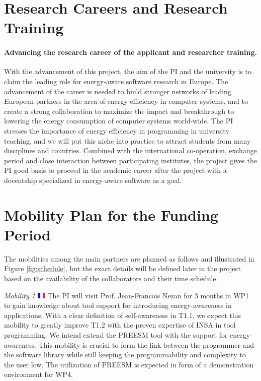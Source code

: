 \documentclass{article}
\begin{document}
\section{Research Careers and Research Training}
\label{sec:cooperation}
\paragraph{Advancing the research career of the applicant and researcher training.}
With the advancement of this project, the aim of the PI and the university is to claim the leading role for energy-aware software research in Europe.
The advancement of the career is needed to build stronger networks of leading European partners in the area of energy efficiency in computer systems,
and to create a strong collaboration to maximize the impact and breakthrough to lowering the energy consumption of computer systems world-wide.
The PI stresses the importance of energy efficiency in programming in university teaching, and we will put this niche into practice to attract students from many disciplines and countries.
Combined with the international co-operation, exchange period and close interaction between participating institutes, the project gives the PI good basis to proceed in the academic career after the project with a docentship specialized in energy-aware software as a goal.

\section{Mobility Plan for the Funding Period}
The mobilities among the main partners are planned as follows and illustrated in Figure \ref{fig:schedule}, but the exact details will be defined later in the project based on the availability of the collaborators and their time schedule.

\textit{Mobility 1 }\includegraphics[width=0.4cm]{fig/fra.png} The PI will visit Prof. Jean-Francois Nezan for 3 months in WP1 to gain knowledge about tool support for introducing energy-awareness in applications.
With a clear definition of self-awareness in T1.1, we expect this mobility to greatly improve T1.2 with the proven expertise of INSA in tool programming.
We intend extend the PREESM tool with the support for energy-awareness.
This mobility is crucial to form the link between the programmer and the software library while still keeping the programmability and complexity to the user low. 
The utilization of PREESM is expected in form of a demonstration environment for WP4.\smallskip
\end{document}
